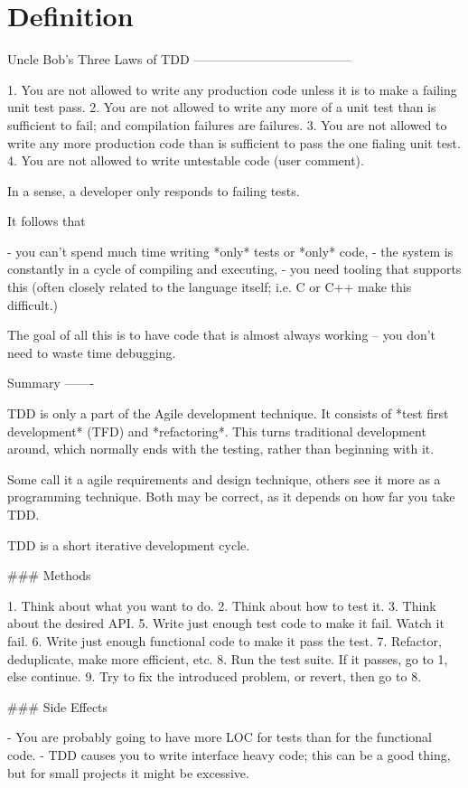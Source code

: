 \documentclass{mitschrift}
\newcommand{\bmn}{\marginpar{Benjamin\\Morgan}}
\begin{document}
\chapter{Definition}
\bmn

Uncle Bob's Three Laws of TDD \cite{UncleBob}
--------------------------------------

 1. You are not allowed to write any production code unless it is to make
    a failing unit test pass.
 2. You are not allowed to write any more of a unit test than is sufficient
    to fail; and compilation failures are failures.
 3. You are not allowed to write any more production code than is sufficient
    to pass the one fialing unit test.
 4. You are not allowed to write untestable code (user comment).

In a sense, a developer only responds to failing tests.

It follows that

 - you can't spend much time writing *only* tests or *only* code,
 - the system is constantly in a cycle of compiling and executing,
 - you need tooling that supports this (often closely related to the
   language itself; i.e. C or C++ make this difficult.)

The goal of all this is to have code that is almost always working – you
don't need to waste time debugging.

Summary
-------

TDD is only a part of the Agile development technique. It consists of *test
first development* (TFD) and *refactoring*. This turns traditional
development around, which normally ends with the testing, rather than
beginning with it.

Some call it a agile requirements and design technique, others see it more
as a programming technique. Both may be correct, as it depends on how far
you take TDD.

TDD is a short iterative development cycle.

### Methods

 1. Think about what you want to do.
 2. Think about how to test it.
 3. Think about the desired API.
 5. Write just enough test code to make it fail. Watch it fail.
 6. Write just enough functional code to make it pass the test.
 7. Refactor, deduplicate, make more efficient, etc.
 8. Run the test suite. If it passes, go to 1, else continue.
 9. Try to fix the introduced problem, or revert, then go to 8.

### Side Effects

 - You are probably going to have more LOC for tests than for the functional
   code. \cite{SQlite} \cite{C2}
 - TDD causes you to write interface heavy code; this can be a good thing,
   but for small projects it might be excessive.
\end{document}
